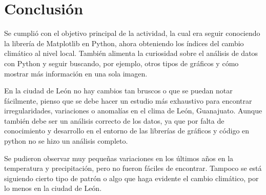 \documentclass{article}
\begin{document}
\section{Conclusión}
\noindent Se cumplió con el objetivo principal de la actividad, la cual era seguir conociendo la librería de Matplotlib en Python, ahora obteniendo los índices del cambio climático al nivel local. También alimenta la curiosidad sobre el análisis de datos con Python y seguir buscando, por ejemplo, otros tipos de gráficos y cómo mostrar más información en una sola imagen.

En la ciudad de León no hay cambios tan bruscos o que se puedan notar fácilmente, pienso que se debe hacer un estudio más exhaustivo para encontrar irregularidades, variaciones o anomalías en el clima de León, Guanajuato. Aunque también debe ser un análisis correcto de los datos, ya que por falta de conocimiento y desarrollo en el entorno de las librerías de gráficos y código en python no se hizo un análisis completo.

Se pudieron observar muy pequeñas variaciones en los últimos años en la temperatura y precipitación, pero no fueron fáciles de encontrar. Tampoco se está siguiendo cierto tipo de patrón o algo que haga evidente el cambio climático, por lo menos en la ciudad de León.
\end{document}
